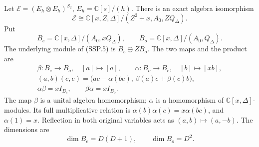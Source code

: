 \begin{theorem}
Let \(\mathcal E=(E_h\otimes E_h)^{S_2}\), \(E_h=\mathbb C[s]/(h)\).
There is an exact algebra isomorphism
\[
 \mathcal E\cong
 \mathbb C[x,Z,\Delta]/(Z^2+x,A_0,ZQ_\Delta).
 \tag{SSP.5}
\]
Put
\[
 B_e=\mathbb C[x,\Delta]/(A_0,xQ_\Delta),\qquad
 B_o=\mathbb C[x,\Delta]/(A_0,Q_\Delta).
 \tag{SSP.6}
\]
The underlying module of (SSP.5) is \(B_e\oplus ZB_o\).
The two maps and the product are
\[
 \begin{gathered}
 \beta:B_e\to B_o,\quad[a]\mapsto[a],\qquad
 \alpha:B_o\to B_e,\quad[b]\mapsto[xb],\\
 (a,b)(c,e)=\bigl(ac-\alpha(be),\,\beta(a)e+\beta(c)b\bigr),\\
 \alpha\beta=xI_{B_e},\qquad \beta\alpha=xI_{B_o}.
 \end{gathered}                                                    \tag{SSP.7}
\]
The map \(\beta\) is a unital algebra homomorphism; \(\alpha\) is
a homomorphism of \(\mathbb C[x,\Delta]\)-modules.  Its full
multiplicative relation is
\(\alpha(b)\alpha(c)=x\alpha(bc)\), and \(\alpha(1)=x\).
Reflection in both original variables acts as \((a,b)\mapsto(a,-b)\).
The dimensions are
\[
 \dim B_e=D(D+1),\qquad \dim B_o=D^2.
 \tag{SSP.8}
\]
\end{theorem}
